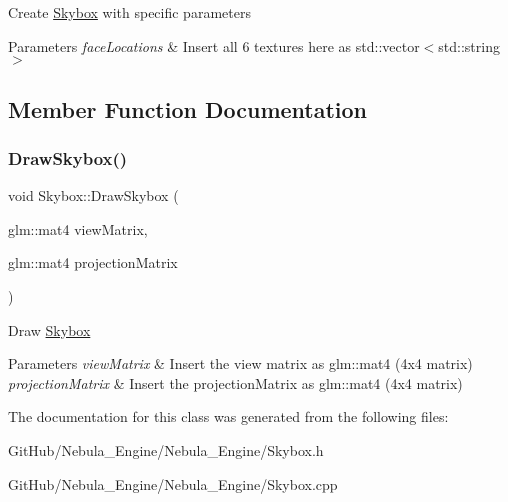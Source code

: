Create \mbox{\hyperlink{class_skybox}{Skybox}} with specific parameters 
\begin{DoxyParams}{Parameters}
{\em face\+Locations} & Insert all 6 textures here as std\+::vector$<$std\+::string$>$ \\
\hline
\end{DoxyParams}


\subsection{Member Function Documentation}
\mbox{\label{class_skybox_aced088463aafa7367558c50ec322c73e}} 
\subsubsection{\texorpdfstring{DrawSkybox()}{DrawSkybox()}}
{\footnotesize\ttfamily void Skybox\+::\+Draw\+Skybox (\begin{DoxyParamCaption}\item[{glm\+::mat4}]{view\+Matrix,  }\item[{glm\+::mat4}]{projection\+Matrix }\end{DoxyParamCaption})}

Draw \mbox{\hyperlink{class_skybox}{Skybox}} 
\begin{DoxyParams}{Parameters}
{\em view\+Matrix} & Insert the view matrix as glm\+::mat4 (4x4 matrix) \\
\hline
{\em projection\+Matrix} & Insert the projection\+Matrix as glm\+::mat4 (4x4 matrix) \\
\hline
\end{DoxyParams}


The documentation for this class was generated from the following files\+:\begin{DoxyCompactItemize}
\item 
Git\+Hub/\+Nebula\+\_\+\+Engine/\+Nebula\+\_\+\+Engine/Skybox.\+h\item 
Git\+Hub/\+Nebula\+\_\+\+Engine/\+Nebula\+\_\+\+Engine/Skybox.\+cpp\end{DoxyCompactItemize}
